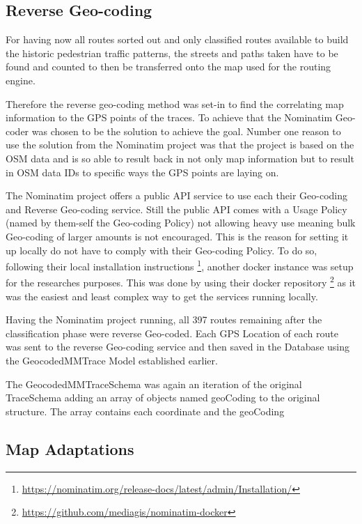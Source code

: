 \subsection{Reverse Geo-coding}

For having now all routes sorted out and only classified routes available to build the historic pedestrian traffic patterns, the streets and paths taken have to be found and counted to then be transferred onto the map used for the routing engine. 

Therefore the reverse geo-coding method was set-in to find the correlating map information to the GPS points of the traces. To achieve that the Nominatim Geo-coder was chosen to be the solution to achieve the goal. Number one reason to use the solution from the Nominatim project was that the project is based on the OSM data and is so able to result back in not only map information but to result in OSM data IDs to specific ways the GPS points are laying on. 

The Nominatim project offers a public API service to use each their Geo-coding and Reverse Geo-coding service. Still the public API comes with a Usage Policy (named by them-self the Geo-coding Policy) not allowing heavy use meaning bulk Geo-coding of larger amounts is not encouraged. This is the reason for setting it up locally do not have to comply with their Geo-coding Policy. To do so, following their local installation instructions \footnote{\url{https://nominatim.org/release-docs/latest/admin/Installation/}}, another docker instance was setup for the researches purposes. This was done by using their docker repository \footnote{\url{https://github.com/mediagis/nominatim-docker}} as it was the easiest and least complex way to get the services running locally.

Having the Nominatim project running, all 397 routes remaining after the classification phase were reverse Geo-coded. Each GPS Location of each route was sent to the reverse Geo-coding service and then saved in the Database using the GeocodedMMTrace Model established earlier. 

The GeocodedMMTraceSchema was again an iteration of the original TraceSchema adding an array of objects named geoCoding to the original structure. The array contains each coordinate and the geoCoding 




\subsection{Map Adaptations}

